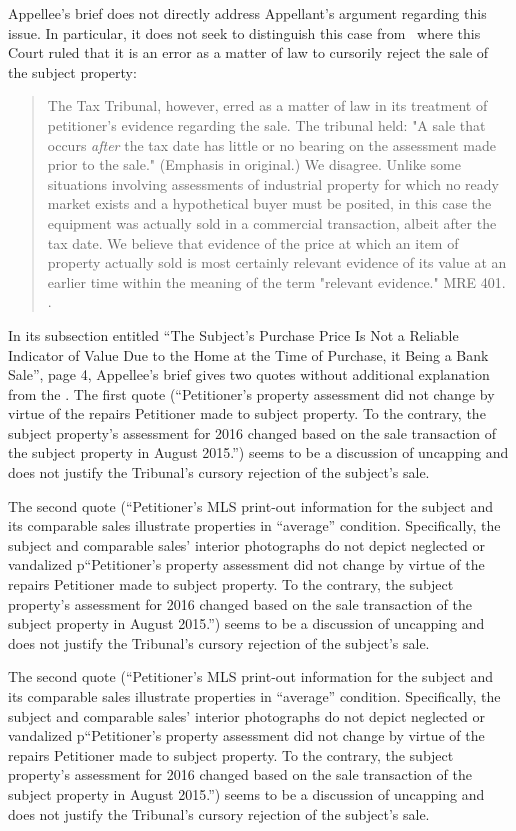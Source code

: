 \documentclass[12pt,\documentclassflag]{michiganCourtOfAppealsBrief}
\begin{document}
Appellee's brief does not directly address Appellant's argument regarding this issue. In particular, it does not seek to distinguish this case from \cite{Jones & Laughlin}\ where this Court ruled that it is an error as a matter of law to cursorily reject the sale of the subject property:

\begin{quote}
  The Tax Tribunal, however, erred as a matter of law in its treatment of petitioner's evidence regarding the sale. The tribunal held: "A sale that occurs {\em after} the tax date has little or no bearing on the assessment made prior to the sale." (Emphasis in original.) We disagree. Unlike some situations involving assessments of industrial property for which no ready market exists and a hypothetical buyer must be posited, in this case the equipment was actually sold in a commercial transaction, albeit after the tax date. We believe that evidence of the price at which an item of property actually sold is most certainly relevant evidence of its value at an earlier time within the meaning of the term "relevant evidence." MRE 401. .
\end{quote}

In its subsection entitled ``The Subject's Purchase Price Is Not a
Reliable Indicator of Value Due to the Home at the Time of Purchase,
it Being a Bank Sale'', page 4, Appellee's brief gives two quotes without additional explanation from the \foj[5]. The first quote
(``Petitioner's property assessment did not change by virtue of the
repairs Petitioner made to subject property. To the contrary, the
subject property's assessment for 2016 changed based on the sale
transaction of the subject property in August 2015.'') seems to be a discussion of uncapping and does not justify the Tribunal's cursory rejection of the subject's sale.

The second quote (``Petitioner's MLS print-out information for the subject and its comparable sales illustrate properties in ``average'' condition.
Specifically, the subject and comparable sales' interior photographs
do not depict neglected or vandalized p``Petitioner's property assessment did not change by virtue of the
repairs Petitioner made to subject property. To the contrary, the
subject property's assessment for 2016 changed based on the sale
transaction of the subject property in August 2015.'') seems to be a discussion of uncapping and does not justify the Tribunal's cursory rejection of the subject's sale.

The second quote (``Petitioner's MLS print-out information for the subject and its comparable sales illustrate properties in ``average'' condition.
Specifically, the subject and comparable sales' interior photographs
do not depict neglected or vandalized p``Petitioner's property assessment did not change by virtue of the
repairs Petitioner made to subject property. To the contrary, the
subject property's assessment for 2016 changed based on the sale
transaction of the subject property in August 2015.'') seems to be a discussion of uncapping and does not justify the Tribunal's cursory rejection of the subject's sale.
\end{document}
